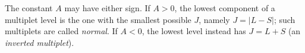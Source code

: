 The constant $A$ may have either sign. If $A>0$, the lowest component of a multiplet level is the one with the smallest possible $J$, namely $J=|L-S|$; such multiplets are called \emph{normal}. If $A<0$, the lowest level instead has $J=L+S$ (an \emph{inverted multiplet}).
